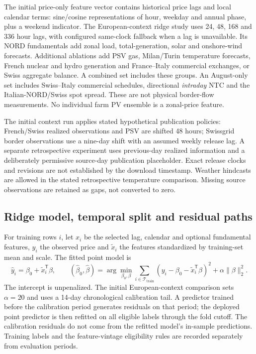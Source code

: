 \documentclass[11pt,a4paper]{article}
\begin{document}
The initial price-only feature vector contains historical price lags and local
calendar terms: sine/cosine representations of hour, weekday and annual phase,
plus a weekend indicator. The European-context ridge study uses 24, 48, 168 and
336 hour lags, with configured same-clock fallback when a lag is unavailable.
Its NORD fundamentals add zonal load, total-generation, solar and onshore-wind
forecasts. Additional ablations add PSV gas, Milan/Turin temperature forecasts,
French nuclear and hydro generation and France--Italy commercial exchanges, or
Swiss aggregate balance. A combined set includes these groups. An August-only
set includes Swiss--Italy commercial schedules, directional \emph{intraday}
NTC and the Italian-NORD/Swiss spot spread. These are not physical border-flow
measurements. No individual farm PV ensemble is a zonal-price feature.

The initial context run applies stated hypothetical publication policies:
French/Swiss realized observations and PSV are shifted 48 hours; Swissgrid
border observations use a nine-day shift with an assumed weekly release lag.
A separate retrospective experiment uses previous-day realized information and
a deliberately permissive source-day publication placeholder. Exact release
clocks and revisions are not established by the download timestamp. Weather
hindcasts are allowed in the stated retrospective temperature comparison.
Missing source observations are retained as gaps, not converted to zero.

\subsection{Ridge model, temporal split and residual paths}
For training rows $i$, let $x_i$ be the selected lag, calendar and optional
fundamental features, $y_i$ the observed price and $\tilde x_i$ the features
standardized by training-set mean and scale. The fitted point model is
\begin{equation}
 \hat y_i=\beta_0+\tilde x_i^{\mathsf T}\beta,\qquad
 (\hat\beta_0,\hat\beta)=\arg\min_{\beta_0,\beta}
 \sum_{i\in\mathcal T_{\mathrm{train}}}
 (y_i-\beta_0-\tilde x_i^{\mathsf T}\beta)^2+\alpha\lVert\beta\rVert_2^2.
\end{equation}
The intercept is unpenalized. The initial European-context comparison sets
$\alpha=20$ and uses a 14-day chronological calibration tail. A predictor
trained before the calibration period generates residuals on that period; the
deployed point predictor is then refitted on all eligible labels through the
fold cutoff. The calibration residuals do not come from the refitted model's
in-sample predictions. Training labels and the feature-vintage eligibility rules
are recorded separately from evaluation periods.
\end{document}

